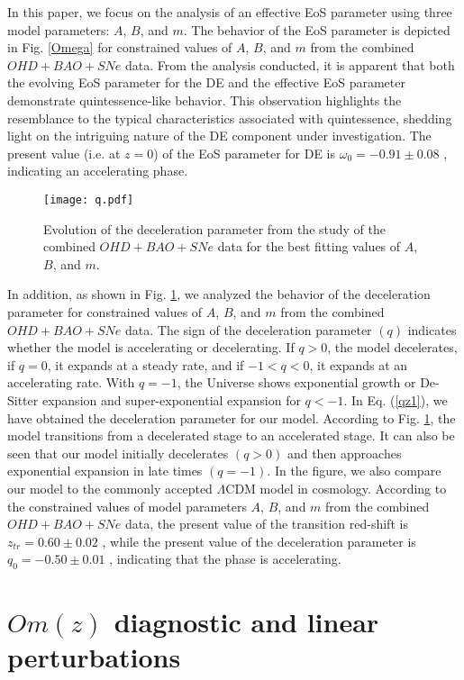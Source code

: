 \documentclass[prd,superscriptaddress,amsfonts,amssymb,amsmath,showpacs,twocolumn]{revtex4-2}
\begin{document}
In this paper, we focus on the analysis of an effective EoS parameter using three model parameters: $A$, $B$, and $m$. The behavior of the EoS parameter is depicted
in Fig. \ref{Omega} for constrained values of $A$, $B$, and $m$ from the
combined $OHD+BAO+SNe$ data. From the analysis conducted, it is apparent that both the evolving EoS parameter for the DE and the effective EoS parameter demonstrate quintessence-like behavior. This observation highlights the resemblance to the typical characteristics associated with quintessence, shedding light on the intriguing nature of the DE component under investigation.
The present value (i.e. at $z=0$) of the EoS parameter for DE is $\omega_{0}=-0.91 \pm 0.08$ \cite{Hernandez,Gruber}, indicating an
accelerating phase.

\begin{figure}[h]
\centerline{\texttt{[image: q.pdf]}}
\caption{Evolution of the deceleration parameter from the study of the
combined $OHD+BAO+SNe$ data for the best fitting values of $A$, $B$, and $m$.}
\label{q}
\end{figure}

In addition, as shown in Fig. \ref{q}, we analyzed the behavior of the
deceleration parameter for constrained values of $A$, $B$, and $m$ from the
combined $OHD+BAO+SNe$ data. The sign of the deceleration parameter $(q)$
indicates whether the model is accelerating or decelerating. If $q > 0$, the
model decelerates, if $q = 0$, it expands at a steady rate, and if $-1 < q <
0$, it expands at an accelerating rate. With $q = -1$, the Universe shows
exponential growth or De-Sitter expansion and super-exponential expansion
for $q < -1$. In Eq. (\ref{qz1}), we have obtained the deceleration
parameter for our model. According to Fig. \ref{q}, the model transitions
from a decelerated stage to an accelerated stage. It can also be seen that
our model initially decelerates $(q > 0)$ and then approaches exponential
expansion in late times $(q = -1)$. In the figure, we also compare our model to the commonly accepted $\Lambda$CDM model in cosmology. According to the constrained values of model
parameters $A$, $B$, and $m$ from the combined $OHD+BAO+SNe$ data, the present
value of the transition red-shift is $z_{tr}=0.60 \pm 0.02$ \cite{Farooq, Jesus, Garza}, while the
present value of the deceleration parameter is  $q_{0}=-0.50 \pm0.01$ \cite{Capozziello, Mamon, Basilakos},
indicating that the phase is accelerating.

\section{$Om(z)$ diagnostic and linear perturbations}
\label{sec5}
\end{document}
